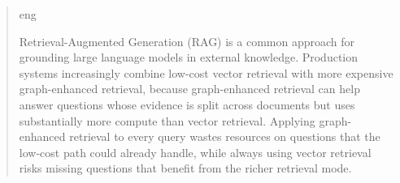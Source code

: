 \documentclass[english, bibtex]{kththesis}               %
\newcommand*{\generalExpl}[1]{\todo[inline]{#1}}
\newcommand*{\engExpl}[1]{\todo[inline, backgroundcolor=kth-lightgreen40]{#1}} %
\renewcommand\generalExpl[1]{}
\renewcommand\engExpl[1]{}
\numberwithin{listing}{chapter}
\begin{document}
\begin{abstract}
  \markboth{\abstractname}{}
\begin{scontents}[store-env=lang]
eng
\end{scontents}
\engExpl{All theses at KTH are \textbf{required} to have an abstract in both \textit{English} and \textit{Swedish}.}

\engExpl{Exchange students may want to include one or more abstracts in the language(s) used in their home institutions to avoid the need to write another thesis when returning to their home institution.}

\generalExpl{Keep in mind that most of your potential readers are only going to read your \texttt{title} and \texttt{abstract}. This is why the abstract must give them enough information so that they can decide if this document is relevant to them or not. Otherwise, the likely default choice is to ignore the rest of your document.\\
An abstract should stand on its own, \ie no citations, cross-references to the body of the document, acronyms must be spelled out, \ldots .\\Write this early and revise as necessary. This will help keep you focused on what you are trying to do.}

\begin{scontents}[store-env=abstracts,print-env=true]
Retrieval-Augmented Generation (RAG) is a common approach for grounding large language models in external knowledge. Production systems increasingly combine low-cost vector retrieval with more expensive graph-enhanced retrieval, because graph-enhanced retrieval can help answer questions whose evidence is split across documents but uses substantially more compute than vector retrieval. Applying graph-enhanced retrieval to every query wastes resources on questions that the low-cost path could already handle, while always using vector retrieval risks missing questions that benefit from the richer retrieval mode.


\end{scontents}
\end{abstract}
\end{document}
